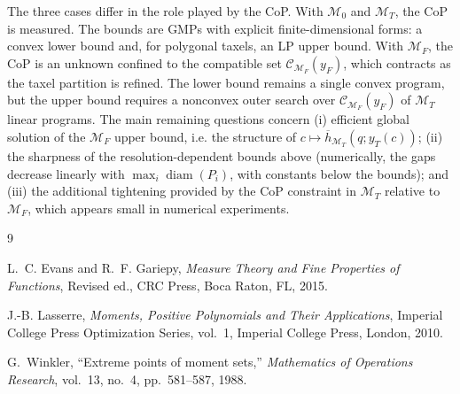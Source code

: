 \documentclass[11pt,a4paper]{article}
\theoremstyle{plain}
\begin{document}
The three cases differ in the role played by the CoP. With $\mathcal M_0$ and
$\mathcal M_T$, the CoP is measured. The bounds are GMPs with explicit finite-dimensional forms: a convex lower bound and,
for polygonal taxels, an LP upper bound. With $\mathcal M_F$, the CoP is an unknown confined to the compatible set
$\mathcal C_{\mathcal M_F}(y_F)$, which contracts as the taxel partition is refined. The lower bound remains a single convex
program, but the upper bound requires a nonconvex outer search over $\mathcal C_{\mathcal M_F}(y_F)$ of $\mathcal M_T$ linear programs.
The main remaining questions concern
(i) efficient global solution of the $\mathcal M_F$ upper bound, i.e. the structure of $c\mapsto\overline h_{\mathcal M_T}(q;y_T(c))$;
(ii) the sharpness of the resolution-dependent bounds above (numerically, the gaps decrease linearly with $\max_i\operatorname{diam}(P_i)$, with constants below the bounds);
and (iii) the additional tightening provided by the CoP constraint in $\mathcal M_T$ relative to $\mathcal M_F$, which appears small in numerical experiments.

\begin{thebibliography}{9}

L.~C. Evans and R.~F. Gariepy,
\newblock \emph{Measure Theory and Fine Properties of Functions},
\newblock Revised ed., CRC Press, Boca Raton, FL, 2015.

J.-B. Lasserre,
\newblock \emph{Moments, Positive Polynomials and Their Applications},
\newblock Imperial College Press Optimization Series, vol.~1,
Imperial College Press, London, 2010.

G.~Winkler,
\newblock ``Extreme points of moment sets,''
\newblock \emph{Mathematics of Operations Research},
vol.~13, no.~4, pp.~581--587, 1988.

\end{thebibliography}
\end{document}
